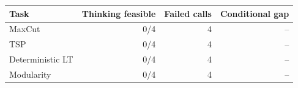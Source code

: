 \begin{tabular}{lrrr}
\toprule
Task & Thinking feasible & Failed calls & Conditional gap \\
\midrule
MaxCut & 0/4 & 4 & -- \\
TSP & 0/4 & 4 & -- \\
Deterministic LT & 0/4 & 4 & -- \\
Modularity & 0/4 & 4 & -- \\
\bottomrule
\end{tabular}
